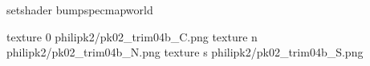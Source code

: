 setshader bumpspecmapworld

texture 0 philipk2/pk02_trim04b_C.png
texture n philipk2/pk02_trim04b_N.png
texture s philipk2/pk02_trim04b_S.png

